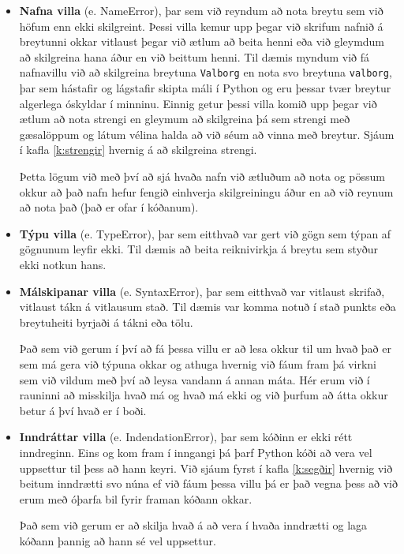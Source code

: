 \begin{itemize}[leftmargin=*]
	\item \textbf{Nafna villa} (e. NameError), þar sem við reyndum að nota breytu sem við höfum enn ekki skilgreint.
	Þessi villa kemur upp þegar við skrifum nafnið á breytunni okkar vitlaust þegar við ætlum að beita henni eða við gleymdum að skilgreina hana áður en við beittum henni.
	Til dæmis myndum við fá nafnavillu við að skilgreina breytuna \texttt{Valborg} en nota svo breytuna \texttt{valborg}, þar sem hástafir og lágstafir skipta máli í Python og eru þessar tvær breytur algerlega óskyldar í minninu.
	Einnig getur þessi villa komið upp þegar við ætlum að nota strengi en gleymum að skilgreina þá sem strengi með gæsalöppum og látum vélina halda að við séum að vinna með breytur.
	Sjáum í kafla \ref{k:strengir} hvernig á að skilgreina strengi.
	
	Þetta lögum við með því að sjá hvaða nafn við ætluðum að nota og pössum okkur að það nafn hefur fengið einhverja skilgreiningu áður en að við reynum að nota það (það er ofar í kóðanum).
	
	\item \textbf{Týpu villa} (e. TypeError), þar sem eitthvað var gert við gögn sem týpan af gögnunum leyfir ekki.
	Til dæmis að beita reiknivirkja á breytu sem styður ekki notkun hans.
	\item \textbf{Málskipanar villa} (e. SyntaxError), þar sem eitthvað var vitlaust skrifað, vitlaust tákn á vitlausum stað.
	Til dæmis var komma notuð í stað punkts eða breytuheiti byrjaði á tákni eða tölu.
	
	Það sem við gerum í því að fá þessa villu er að lesa okkur til um hvað það er sem má gera við týpuna okkar og athuga hvernig við fáum fram þá virkni sem við vildum með því að leysa vandann á annan máta.
	Hér erum við í rauninni að misskilja hvað má og hvað má ekki og við þurfum að átta okkur betur á því hvað er í boði.
	
	\item \textbf{Inndráttar villa} (e. IndendationError), þar sem kóðinn er ekki rétt inndreginn.
	Eins og kom fram í inngangi þá þarf Python kóði að vera vel uppsettur til þess að hann keyri.
	Við sjáum fyrst í kafla \ref{k:segðir} hvernig við beitum inndrætti svo núna ef við fáum þessa villu þá er það vegna þess að við erum með óþarfa bil fyrir framan kóðann okkar. 
	
	Það sem við gerum er að skilja hvað á að vera í hvaða inndrætti og laga kóðann þannig að hann sé vel uppsettur.
	

\end{itemize}
